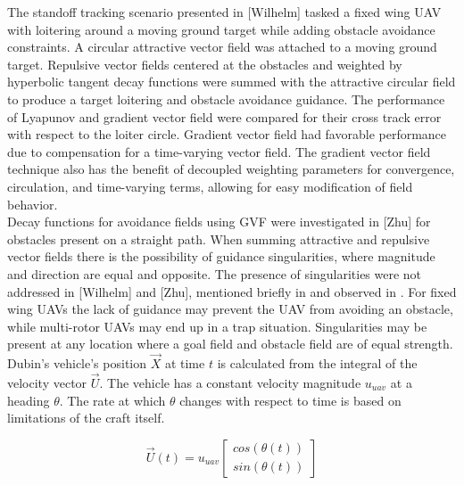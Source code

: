 \documentclass[conf]{new-aiaa}
\begin{document}
The standoff tracking scenario presented in [Wilhelm] tasked a fixed wing UAV with loitering around a moving ground target while adding obstacle avoidance constraints. A circular attractive vector field was attached to a moving ground target. Repulsive vector fields centered at the obstacles and weighted by hyperbolic tangent decay functions were summed with the attractive circular field to produce a target loitering and obstacle avoidance guidance. The performance of Lyapunov \cite{frew_cooperative_2007} and gradient vector field \cite{goncalves_artificial_2009,goncalves_circulation_2010,goncalves_vector_2010} were compared for their cross track error with respect to the loiter circle. Gradient vector field had favorable performance due to compensation for a time-varying vector field. The gradient vector field technique also has the benefit of decoupled weighting parameters for convergence, circulation, and time-varying terms, allowing for easy modification of field behavior. \\

Decay functions for avoidance fields using GVF were investigated in [Zhu] for obstacles present on a straight path. When summing attractive and repulsive vector fields there is the possibility of guidance singularities, where magnitude and direction are equal and opposite. The presence of singularities were not addressed in [Wilhelm] and [Zhu], mentioned briefly in \cite{nelson_cooperative_2005} and observed in \cite{panagou_motion_2014}. For fixed wing UAVs the lack of guidance may prevent the UAV from avoiding an obstacle, while multi-rotor UAVs may end up in a trap situation. Singularities may be present at any location where a goal field and obstacle field are of equal strength. \\



Dubin's vehicle's position $\overrightarrow{X}$ at time $t$ is calculated from the integral of the velocity vector $\overrightarrow{U}$. The vehicle has a constant velocity magnitude $u_{uav}$ at a heading $\theta$. The rate at which $\theta$ changes with respect to time is based on limitations of the craft itself. 

\begin{equation}
\label{uavVelocity}
\overrightarrow{U}(t) = u_{uav} \begin{bmatrix}
cos(\theta(t)) \\
sin(\theta(t))
\end{bmatrix}
\end{equation}
\end{document}
